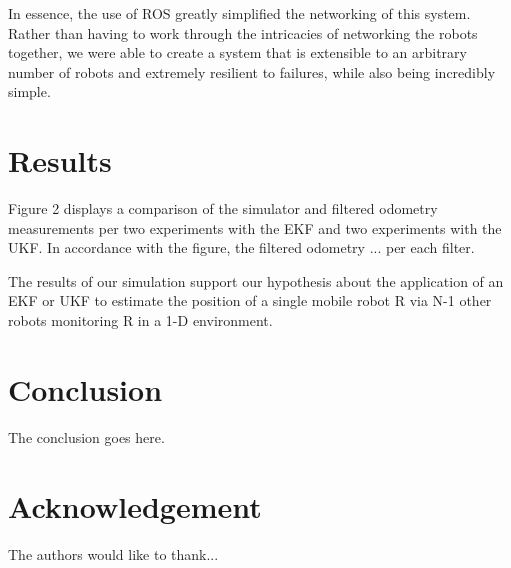 \documentclass[conference]{IEEEtran}
\begin{document}
In essence, the use of ROS greatly simplified the networking of this system. Rather than having to work through the 
intricacies of networking the robots together, we were able to create a system that is extensible to an arbitrary 
number of robots and extremely resilient to failures, while also being incredibly simple.

\section{Results}
Figure 2 displays a comparison of the simulator and filtered odometry measurements per two experiments with the EKF and 
two experiments with the UKF. In accordance with the figure, the filtered odometry ... 
per each filter.

The results of our simulation support our hypothesis about the application of an EKF or UKF to estimate the position of 
a single mobile robot R via N-1 other robots monitoring R in a 1-D environment. 
\section{Conclusion}
The conclusion goes here.

\section*{Acknowledgement}


The authors would like to thank...



%
%
%
\printbibliography
\end{document}
